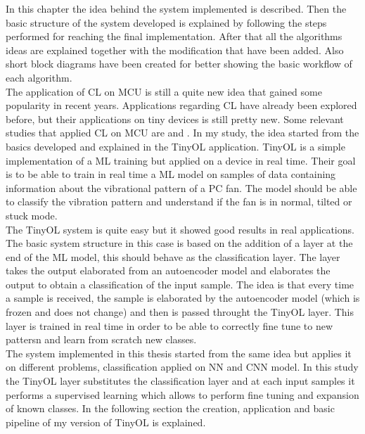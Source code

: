 \documentclass[12pt]{report}
\begin{document}
In this chapter the idea behind the system implemented is described. Then the basic structure of the system developed is explained by following the steps performed for reaching the final implementation. After that all the algorithms ideas are explained together with the modification that have been added. Also short block diagrams have been created for better showing the basic workflow of each algorithm.\\
The application of CL on MCU is still a quite new idea that gained some popularity in recent years. Applications regarding CL have already been explored before, but their applications on tiny devices is still pretty new. Some relevant studies that applied CL on MCU are \autocite{} and \autocite{}. In my study, the idea started from the basics developed and explained in the TinyOL application. TinyOL is a simple implementation of a ML training but applied on a device in real time. Their goal is to be able to train in real time a ML model on samples of data containing information about the vibrational pattern of a PC fan. The model should be able to classify the vibration pattern and understand if the fan is in normal, tilted or stuck mode.\\
The TinyOL system is quite easy but it showed good results in real applications. The basic system structure in this case is based on the addition of a layer at the end of the ML model, this should behave as the classification layer. The layer takes the output elaborated from an autoencoder model and elaborates the output to obtain a classification of the input sample. The idea is that every time a sample is received, the sample is elaborated by the autoencoder model (which is frozen and does not change) and then is passed throught the TinyOL layer. This layer is trained in real time in order to be able to correctly fine tune to new pattersn and learn from scratch new classes.\\
The system implemented in this thesis started from the same idea but applies it on different problems, classification applied on NN and CNN model. In this study the TinyOL layer substitutes the classification layer and at each input samples it performs a supervised learning which allows to perform fine tuning and expansion of known classes. In the following section the creation, application and basic pipeline of my version of TinyOL is explained. 
\end{document}
